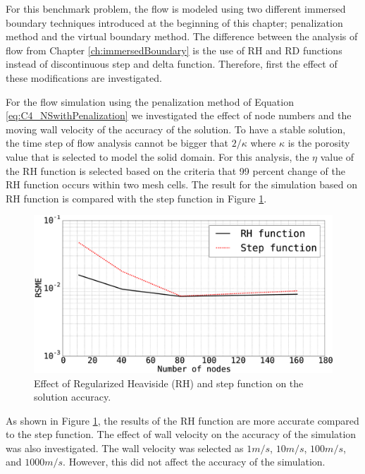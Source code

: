 For this benchmark problem, the flow is modeled using two different immersed boundary techniques introduced at the beginning of this chapter; penalization method and the virtual boundary method. The difference between the analysis of flow from Chapter \ref{ch:immersedBoundary} is the use of RH and RD functions instead of discontinuous step and delta function. Therefore, first the effect of these modifications are investigated.

For the flow simulation using the penalization method of Equation \eqref{eq:C4_NSwithPenalization} we investigated the effect of node numbers and the moving wall velocity of the accuracy of the solution. To have a stable solution, the time step of flow analysis cannot be bigger that $2 / \kappa$ where $\kappa$ is the porosity value that is selected to model the solid domain. For this analysis, the $\eta$ value of the RH function is selected based on the criteria that 99 percent change of the RH function occurs within two mesh cells. The result for the simulation based on RH function is compared with the step function in Figure \ref{fig:C4_effectOfRHfunctionOnSimulationResults1Dproblem}.

\begin{figure}[H]
    \centering
    \includegraphics[width=12.00cm]{Chapter_4/figure/effect_of_RH_on_simulation_vs_numberOfNodes_1D_problem.eps}
    \caption{Effect of Regularized Heaviside (RH) and step function on the solution accuracy.}
    \label{fig:C4_effectOfRHfunctionOnSimulationResults1Dproblem}
\end{figure}

As shown in Figure \ref{fig:C4_effectOfRHfunctionOnSimulationResults1Dproblem}, the results of the RH function are more accurate compared to the step function. The effect of wall velocity on the accuracy of the simulation was also investigated. The wall velocity was selected as $1 m/s$, $10 m/s$, $100 m/s$, and $1000 m/s$. However, this did not affect the accuracy of the simulation.


